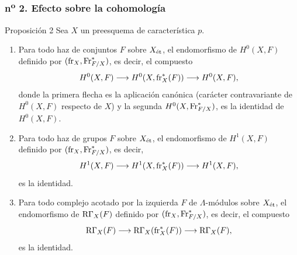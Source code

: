\subsubsection*{n\textsuperscript{o} 2. Efecto sobre la cohomología}

\begin{statement}{Proposición 2}
Sea $X$ un preesquema de característica $p$.
\begin{enumerate}[label=\alph*)]
\item Para todo haz de conjuntos $F$ sobre $X_{\mathrm{\acute{e}t}}$, el endomorfismo de $H^0(X,F)$ definido por $(\operatorname{fr}_X,\operatorname{Fr}^*_{F/X})$, es decir, el compuesto
\[
H^0(X,F)\longrightarrow H^0(X,\operatorname{fr}_X^*(F))\longrightarrow H^0(X,F),
\]
donde la primera flecha es la aplicación canónica (carácter contravariante de $H^0(X,F)$ respecto de $X$) y la segunda $H^0(X,\operatorname{Fr}^*_{F/X})$, es la identidad de $H^0(X,F)$.
\item Para todo haz de grupos $F$ sobre $X_{\mathrm{\acute{e}t}}$, el endomorfismo de $H^1(X,F)$ definido por $(\operatorname{fr}_X,\operatorname{Fr}^*_{F/X})$, es decir,
\[
H^1(X,F)\longrightarrow H^1(X,\operatorname{fr}_X^*(F))\longrightarrow H^1(X,F),
\]
es la identidad.
\item Para todo complejo acotado por la izquierda $F$ de $\Lambda$-módulos sobre $X_{\mathrm{\acute{e}t}}$, el endomorfismo de $\mathrm{R}\Gamma_X(F)$ definido por $(\operatorname{fr}_X,\operatorname{Fr}^*_{F/X})$, es decir, el compuesto
\[
\mathrm{R}\Gamma_X(F)\longrightarrow \mathrm{R}\Gamma_X(\operatorname{fr}_X^*(F))\longrightarrow \mathrm{R}\Gamma_X(F),
\]
es la identidad.
\end{enumerate}
\end{statement}
